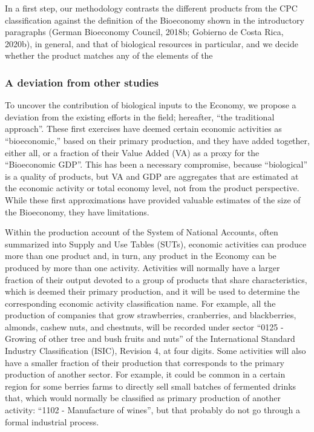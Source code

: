 \documentclass[
  letterpaper,
  DIV=11,
  numbers=noendperiod]{scrartcl}
\begin{document}
In a first step, our methodology contrasts the different products from
the CPC classification against the definition of the Bioeconomy shown in
the introductory paragraphs (German Bioeconomy Council, 2018b; Gobierno
de Costa Rica, 2020b), in general, and that of biological resources in
particular, and we decide whether the product matches any of the
elements of the

\subsubsection{A deviation from other
studies}\label{a-deviation-from-other-studies}

To uncover the contribution of biological inputs to the Economy, we
propose a deviation from the existing efforts in the field; hereafter,
``the traditional approach''. These first exercises have deemed certain
economic activities as ``bioeconomic,'' based on their primary
production, and they have added together, either all, or a fraction of
their Value Added (VA) as a proxy for the ``Bioeconomic GDP''. This has
been a necessary compromise, because ``biological'' is a quality of
products, but VA and GDP are aggregates that are estimated at the
economic activity or total economy level, not from the product
perspective. While these first approximations have provided valuable
estimates of the size of the Bioeconomy, they have limitations.

Within the production account of the System of National Accounts, often
summarized into Supply and Use Tables (SUTs), economic activities can
produce more than one product and, in turn, any product in the Economy
can be produced by more than one activity. Activities will normally have
a larger fraction of their output devoted to a group of products that
share characteristics, which is deemed their primary production, and it
will be used to determine the corresponding economic activity
classification name. For example, all the production of companies that
grow strawberries, cranberries, and blackberries, almonds, cashew nuts,
and chestnuts, will be recorded under sector ``0125 - Growing of other
tree and bush fruits and nuts'' of the International Standard Industry
Classification (ISIC), Revision 4, at four digits. Some activities will
also have a smaller fraction of their production that corresponds to the
primary production of another sector. For example, it could be common in
a certain region for some berries farms to directly sell small batches
of fermented drinks that, which would normally be classified as primary
production of another activity: ``1102 - Manufacture of wines'', but
that probably do not go through a formal industrial process.
\end{document}
